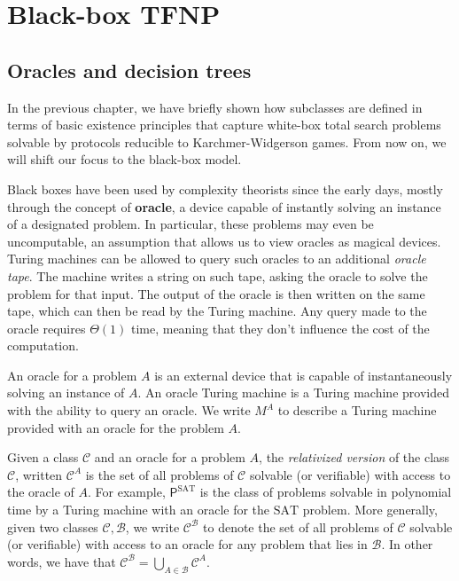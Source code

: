 
\chapter{Black-box TFNP} \label{chap:bb-tfnp}

\section{Oracles and decision trees}

In the previous chapter, we have briefly shown how \TFNP subclasses are defined in terms of basic existence principles that capture white-box total search problems solvable by protocols reducible to Karchmer-Widgerson games. From now on, we will shift our focus to the black-box model.

Black boxes have been used by complexity theorists since the early days, mostly through the concept of \textbf{oracle}, a device capable of instantly solving an instance of a designated problem. In particular, these problems may even be uncomputable, an assumption that allows us to view oracles as magical devices. Turing machines can be allowed to query such oracles to an additional \textit{oracle tape}. The machine writes a string on such tape, asking the oracle to solve the problem for that input. The output of the oracle is then written on the same tape, which can then be read by the Turing machine. Any query made to the oracle requires $\Theta(1)$ time, meaning that they don't influence the cost of the computation.

\begin{definition}
 An oracle for a problem $A$ is an external device that is capable of instantaneously solving an instance of $A$. An oracle Turing machine is a Turing machine provided with the ability to query an oracle. We write $M^A$ to describe a Turing machine provided with an oracle for the problem $A$.
\end{definition}

Given a class $\mathcal{C}$ and an oracle for a problem $A$, the \textit{relativized version} of the class $\mathcal{C}$, written $\mathcal{C}^A$ is the set of all problems of $\mathcal{C}$ solvable (or verifiable) with access to the oracle of $A$. For example, $\mathsf{P}^{\mathrm{SAT}}$ is the class of problems solvable in polynomial time by a Turing machine with an oracle for the $\mathrm{SAT}$ problem. More generally, given two classes $\mathcal{C}, \mathcal{B}$, we write $\mathcal{C}^{\mathcal{B}}$ to denote the set of all problems of $\mathcal{C}$ solvable (or verifiable) with access to an oracle for any problem that lies in $\mathcal{B}$. In other words, we have that $\mathcal{C}^{\mathcal{B}} = \bigcup_{A \in \mathcal{B}} \mathcal{C}^{A}$.

